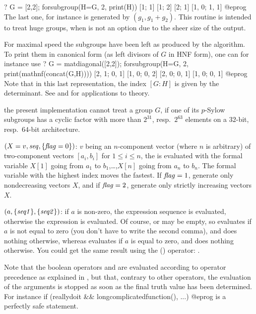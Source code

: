 \bprog
? G = [2,2]; forsubgroup(H=G, 2, print(H))
[1; 1]
[1; 2]
[2; 1]
[1, 0; 1, 1]
@eprog
The last one, for instance is generated by $(g_1, g_1 + g_2)$. This
routine is intended to treat huge groups, when  is not an
option due to the sheer size of the output.

For maximal speed the subgroups have been left as produced by the algorithm.
To print them in canonical form (as left divisors of $G$ in HNF form), one
can for instance use
\bprog
? G = matdiagonal([2,2]); forsubgroup(H=G, 2, print(mathnf(concat(G,H))))
[2, 1; 0, 1]
[1, 0; 0, 2]
[2, 0; 0, 1]
[1, 0; 0, 1]
@eprog\noindent
Note that in this last representation, the index $[G:H]$ is given by the
determinant. See  and  for
 applications to  theory.

 the present implementation cannot treat a group $G$, if
one of its $p$-Sylow subgroups has a cyclic factor with more than $2^{31}$,
resp.~$2^{63}$ elements on a $32$-bit, resp.~$64$-bit architecture.

$(X=v,\hbox{\it seq\/},\{\hbox{\it f\kern0pt lag\/}=0\})$: $v$ being an $n$-component
vector (where $n$ is arbitrary) of two-component vectors $[a_i,b_i]$
for $1\le i\le n$, the  is evaluated with the formal variable
$X[1]$ going from $a_1$ to $b_1$,\dots,$X[n]$ going from $a_n$ to $b_n$.
The formal variable with the highest index moves the fastest. If $\hbox{\it f\kern0pt lag\/}=1$,
generate only nondecreasing vectors $X$, and if $\hbox{\it f\kern0pt lag\/}=2$, generate only
strictly increasing vectors $X$.

$(a,\{\hbox{\it seq1\/}\},\{\hbox{\it seq2\/}\})$: if $a$ is non-zero,
the expression sequence  is evaluated, otherwise the expression
 is evaluated. Of course,  or  may be empty,
so  evaluates  if $a$ is not equal to zero
(you don't have to write the second comma), and does nothing otherwise,
whereas  evaluates  if $a$ is equal to
zero, and does nothing otherwise. You could get the same result using
the \kbd{!} () operator: .

  Note that the boolean operators \kbd{\&\&} and \kbd{||} are evaluated
according to operator precedence as explained in , but
that, contrary to other operators, the evaluation of the arguments is
stopped as soon as the final truth value has been determined. For instance
\bprog
if (reallydoit && longcomplicatedfunction(), ...)%
@eprog
\noindent is a perfectly safe statement.

